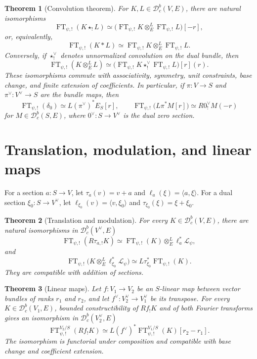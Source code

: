 \documentclass[10pt]{article}
\newtheorem{theorem}{Theorem}[section]
\theoremstyle{definition}
\newcommand{\Dbc}{\mathcal D^b_c}
\newcommand{\FT}{\operatorname{FT}}
\begin{document}
\begin{theorem}[Convolution theorem]
For \(K,L\in\Dbc(V,E)\), there are natural isomorphisms
\[
 \FT_{\psi,!}(K\star_!L)
 \simeq
 \bigl(\FT_{\psi,!}K\otimes_E^L\FT_{\psi,!}L\bigr)[-r],
\]
or, equivalently,
\[
 \FT_{\psi,!}(K*L)
 \simeq
 \FT_{\psi,!}K\otimes_E^L\FT_{\psi,!}L.
\]
Conversely, if \(\star_!^\vee\) denotes unnormalized convolution on the dual
bundle, then
\[
 \FT_{\psi,!}(K\otimes_E^LL)
 \simeq
 \bigl(\FT_{\psi,!}K\star_!^\vee
       \FT_{\psi,!}L\bigr)[r](r).
\]
These isomorphisms commute with associativity, symmetry, unit constraints,
base change, and finite extension of coefficients.  In particular, if
\(\pi:V\to S\) and \(\pi^\vee:V^\vee\to S\) are the bundle maps, then
\[
 \FT_{\psi,!}(\delta_0)\simeq L(\pi^\vee)^*E_S[r],
 \qquad
 \FT_{\psi,!}\bigl(L\pi^*M[r]\bigr)
 \simeq R0^\vee_!M(-r)
\]
for \(M\in\Dbc(S,E)\), where \(0^\vee:S\to V^\vee\) is the dual zero
section.
\end{theorem}

\section{Translation, modulation, and linear maps}

For a section \(a:S\to V\), let \(\tau_a(v)=v+a\) and
\(\ell_a(\xi)=\langle a,\xi\rangle\).  For a dual section
\(\xi_0:S\to V^\vee\), let
\(\ell_{\xi_0}(v)=\langle v,\xi_0\rangle\) and
\(\tau_{\xi_0}(\xi)=\xi+\xi_0\).

\begin{theorem}[Translation and modulation]
For every \(K\in\Dbc(V,E)\), there are natural isomorphisms in
\(\Dbc(V^\vee,E)\)
\[
 \FT_{\psi,!}(R\tau_{a,!}K)
 \simeq
 \FT_{\psi,!}(K)\otimes_E^L\ell_a^*\mathcal L_\psi,
\]
and
\[
 \FT_{\psi,!}\bigl(K\otimes_E^L
 \ell_{\xi_0}^*\mathcal L_\psi\bigr)
 \simeq
 L\tau_{\xi_0}^*\FT_{\psi,!}(K).
\]
They are compatible with addition of sections.
\end{theorem}

\begin{theorem}[Linear maps]
Let \(f:V_1\to V_2\) be an \(S\)-linear map between vector bundles of ranks
\(r_1\) and \(r_2\), and let \(f^\vee:V_2^\vee\to V_1^\vee\) be its
transpose.  For every \(K\in\Dbc(V_1,E)\), bounded constructibility of
\(Rf_!K\) and of both Fourier transforms gives an isomorphism in
\(\Dbc(V_2^\vee,E)\)
\[
 \FT^{V_2/S}_{\psi,!}(Rf_!K)
 \simeq
 L(f^\vee)^*\FT^{V_1/S}_{\psi,!}(K)[r_2-r_1].
\]
The isomorphism is functorial under composition and compatible with base
change and coefficient extension.
\end{theorem}
\end{document}
